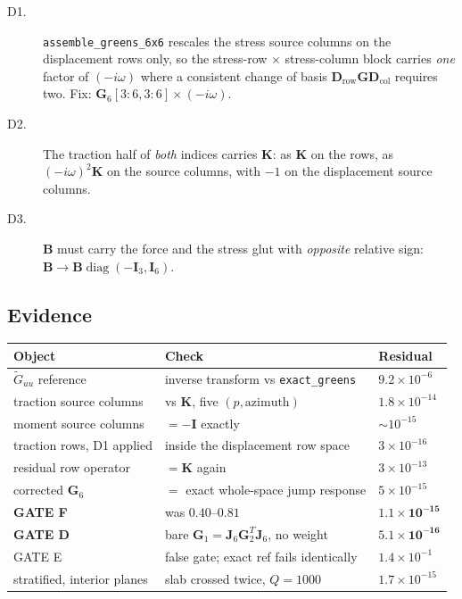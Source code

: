 \documentclass[11pt,a4paper]{article}
\newcommand{\bI}{\mathbf{I}}
\newcommand{\bJ}{\mathbf{J}}
\newcommand{\bB}{\mathbf{B}}
\newcommand{\bG}{\mathbf{G}}
\newcommand{\bD}{\mathbf{D}}
\newcommand{\bK}{\mathbf{K}}
\begin{document}
\begin{description}
\item[D1.] \texttt{assemble\_greens\_6x6} rescales the stress source columns on
  the displacement rows only, so the stress-row $\times$ stress-column block
  carries \emph{one} factor of $(-i\omega)$ where a consistent change of basis
  $\bD_{\text{row}}\bG\bD_{\text{col}}$ requires two.  Fix:
  $\bG_6[3\!:\!6,3\!:\!6] \times (-i\omega)$.
\item[D2.] The traction half of \emph{both} indices carries $\bK$: as $\bK$ on
  the rows, as $(-i\omega)^2\bK$ on the source columns, with $-1$ on the
  displacement source columns.
\item[D3.] $\bB$ must carry the force and the stress glut with \emph{opposite}
  relative sign: $\bB \to \bB\operatorname{diag}(-\bI_3,\bI_6)$.
\end{description}

\subsection{Evidence}

\begin{center}
\begin{tabular}{lll}
\toprule
Object & Check & Residual \\
\midrule
$\tilde{G}_{uu}$ reference & inverse transform vs \texttt{exact\_greens} & $9.2\times10^{-6}$ \\
traction source columns & vs $\bK$, five $(p,\text{azimuth})$ & $1.8\times10^{-14}$ \\
moment source columns & $=-\bI$ exactly & $\sim10^{-15}$ \\
traction rows, D1 applied & inside the displacement row space & $3\times10^{-16}$ \\
residual row operator & $=\bK$ again & $3\times10^{-13}$ \\
corrected $\bG_6$ & $=$ exact whole-space jump response & $5\times10^{-15}$ \\
\textbf{GATE F} & was $0.40$--$0.81$ & $\mathbf{1.1\times10^{-15}}$ \\
\textbf{GATE D} & bare $\bG_1 = \bJ_6\bG_2^{T}\bJ_6$, no weight & $\mathbf{5.1\times10^{-16}}$ \\
GATE E & false gate; exact ref fails identically & $1.4\times10^{-1}$ \\
stratified, interior planes & slab crossed twice, $Q=1000$ & $1.7\times10^{-15}$ \\
\bottomrule
\end{tabular}
\end{center}
\end{document}
